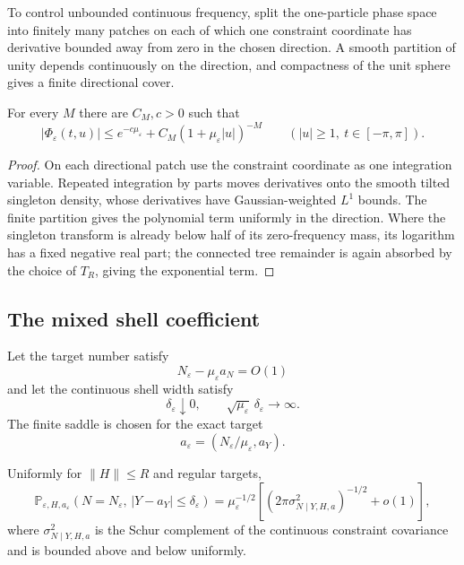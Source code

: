 To control unbounded continuous frequency, split the one-particle phase
space into finitely many patches on each of which one constraint coordinate
has derivative bounded away from zero in the chosen direction.  A smooth
partition of unity depends continuously on the direction, and compactness of
the unit sphere gives a finite directional cover.

\begin{lemma}
\label{lem:r5-b1-high}
For every \(M\) there are \(C_M,c>0\) such that
\[
 |\Phi_\varepsilon(t,u)|
 \le e^{-c\mu_\varepsilon}
     +C_M(1+\mu_\varepsilon|u|)^{-M}
 \qquad(|u|\ge1,\ t\in[-\pi,\pi]).
\]
\end{lemma}

\begin{proof}
On each directional patch use the constraint coordinate as one integration
variable.  Repeated integration by parts moves derivatives onto the smooth
tilted singleton density, whose derivatives have Gaussian-weighted
\(L^1\) bounds.  The finite partition gives the polynomial term uniformly in
the direction.  Where the singleton transform is already below half of its
zero-frequency mass, its logarithm has a fixed negative real part; the
connected tree remainder is again absorbed by the choice of \(T_R\), giving
the exponential term.
\end{proof}

\subsection{The mixed shell coefficient}

Let the target number satisfy
\[
 N_\varepsilon-\mu_\varepsilon a_N=O(1)
\]
and let the continuous shell width satisfy
\[
 \delta_\varepsilon\downarrow0,\qquad
 \sqrt{\mu_\varepsilon}\,\delta_\varepsilon\to\infty.
\]
The finite saddle is chosen for the exact target
\[
 a_\varepsilon=
 \left(N_\varepsilon/\mu_\varepsilon,a_Y\right).
\]

\begin{theorem}
\label{thm:r5-b1-coefficient}
Uniformly for \(\|H\|\le R\) and regular targets,
\[
 \mathbb P_{\varepsilon,H,a_\varepsilon}
 \left(
 N=N_\varepsilon,\,
 |Y-a_Y|\le\delta_\varepsilon
 \right)
 =
 \mu_\varepsilon^{-1/2}
 \left[
 (2\pi\sigma^2_{N\mid Y,H,a})^{-1/2}+o(1)
 \right],
\]
where \(\sigma^2_{N\mid Y,H,a}\) is the Schur complement of the continuous
constraint covariance and is bounded above and below uniformly.
\end{theorem}

